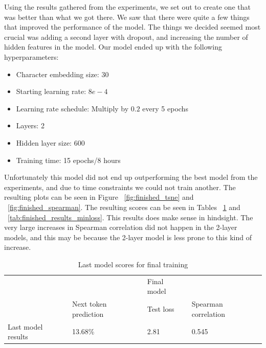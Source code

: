 Using the results gathered from the experiments, we set out to create one that was better than what we got there. We saw that there were quite a few things that improved the performance of the model. The things we decided seemed most crucial was adding a second layer with dropout, and increasing the number of hidden features in the model. Our model ended up with the following hyperparameters:
\begin{itemize}
    \item Character embedding size: 30
    \item Starting learning rate: $8e-4$
    \item Learning rate schedule: Multiply by $0.2$ every 5 epochs
    \item Layers: 2
    \item Hidden layer size: $600$
    \item Training time: 15 epochs/8 hours
\end{itemize}

Unfortunately this model did not end up outperforming the best model from the experiments, and due to time constraints we could not train another. The resulting plots can be seen in Figure ~\ref{fig:finished_tsne} and ~\ref{fig:finished_spearman}. The resulting scores can be seen in Tables ~\ref{tab:finished_results_final} and ~\ref{tab:finished_results_minloss}. This results does make sense in hindsight. The very large increases in Spearman correlation did not happen in the 2-layer models, and this may be because the 2-layer model is less prone to this kind of increase.

\begin{table}[!ht]
\begin{tabular}{|l|lll|}
\hline
                   &                                            & Final model                    &                      \\ \cline{2-4}
                   & \multicolumn{1}{l|}{Next token prediction} & \multicolumn{1}{l|}{Test loss} & Spearman correlation \\ \hline
Last model results & \multicolumn{1}{l|}{13.68\%}               & \multicolumn{1}{l|}{2.81}      & 0.545                \\ \hline
\end{tabular}
\caption{Last model scores for final training}
\label{tab:finished_results_final}
\end{table}

